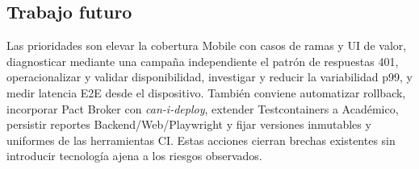 \subsection{Trabajo futuro}
\label{subsec:trabajo-futuro}

Las prioridades son elevar la cobertura Mobile con casos de ramas y UI de valor,
diagnosticar mediante una campaña independiente el patrón de respuestas 401,
operacionalizar y validar disponibilidad, investigar y reducir la variabilidad
p99, y medir latencia E2E
desde el dispositivo. También conviene automatizar rollback, incorporar Pact
Broker con \emph{can-i-deploy}, extender Testcontainers a Académico, persistir
reportes Backend/Web/Playwright y fijar versiones inmutables y uniformes de las
herramientas CI. Estas acciones cierran brechas existentes sin introducir
tecnología ajena a los riesgos observados.
